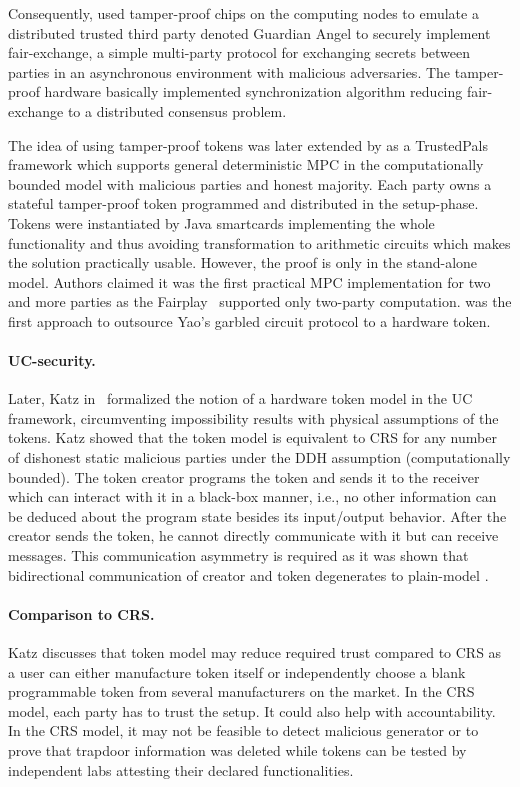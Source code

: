 \documentclass[
  digital, %
  twoside, %
  table,   %
  lof,     %
  lot,     %
]{fithesis3}
\theoremstyle{definition}
\theoremstyle{remark}
\begin{document}
Consequently, \cite{AV04} used tamper-proof chips on the computing nodes to emulate a distributed trusted third party denoted Guardian Angel to securely implement fair-exchange, a simple multi-party protocol for exchanging secrets between parties in an asynchronous environment with malicious adversaries. The tamper-proof hardware basically implemented synchronization algorithm reducing fair-exchange to a distributed consensus problem. 

The idea of using tamper-proof tokens was later extended by \cite{FFPBK06} as a TrustedPals framework which supports general deterministic MPC in the computationally bounded model with malicious parties and honest majority. Each party owns a stateful tamper-proof token programmed and distributed in the setup-phase. Tokens were instantiated by Java smartcards implementing the whole functionality \cite{DW99} and thus avoiding transformation to arithmetic circuits which makes the solution practically usable. However, the proof is only in the stand-alone model. Authors claimed it was the first practical MPC implementation for two and more parties as the Fairplay~\cite{MNPS04} supported only two-party computation.
\cite{JKSS10} was the first approach to outsource Yao's garbled circuit protocol to a hardware token.

\paragraph{UC-security.} %
Later, Katz in~\cite{K07} formalized the notion of a hardware token model in the UC framework, circumventing impossibility results with physical assumptions of the tokens. Katz showed that the token model is equivalent to CRS for any number of dishonest static malicious parties under the DDH assumption (computationally bounded). %
The token creator programs the token and sends it to the receiver which can interact with it in a black-box manner, i.e., no other information can be deduced about the program state besides its input/output behavior. %
After the creator sends the token, he cannot directly communicate with it but can receive messages. This communication asymmetry is required as it was shown that bidirectional communication of creator and token degenerates to plain-model \cite{CGS08}.

\paragraph{Comparison to CRS.} %
Katz discusses that token model may reduce required trust compared to CRS as a user can either manufacture token itself or independently choose a blank programmable token from several manufacturers on the market. In the CRS model, each party has to trust the setup.
It could also help with accountability. In the CRS model, it may not be feasible to detect malicious generator or to prove that trapdoor information was deleted while tokens can be tested by independent labs attesting their declared functionalities.
\end{document}
